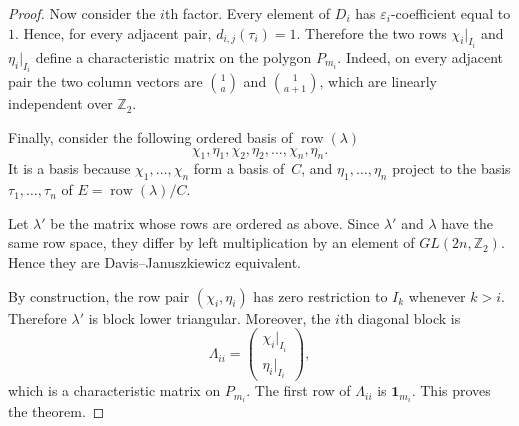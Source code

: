 \documentclass[10pt,a4paper]{amsart}
\newcommand{\Z}{\mathbb Z}
\newcommand{\one}{\mathbf 1}
\DeclareMathOperator{\row}{row}
\begin{document}
\begin{proof}
    Now consider the $i$th factor.
    Every element of $D_i$ has $\varepsilon_i$-coefficient equal to $1$.
    Hence, for every adjacent pair, $d_{i,j}(\tau_i)=1$.
    Therefore the two rows $\chi_i|_{I_i}$ and $\eta_i|_{I_i}$ define a characteristic matrix on the polygon $P_{m_i}$.
    Indeed, on every adjacent pair the two column vectors are $\binom{1}{a}$ and $\binom{1}{a+1}$, which are linearly independent over $\Z_2$.
        
    Finally, consider the following ordered basis of $\row(\lambda)$
    $$
            \chi_1,\eta_1,\chi_2,\eta_2,\ldots,\chi_n,\eta_n.
    $$
    It is a basis because $\chi_1,\ldots,\chi_n$ form a basis of~$C$, and $\eta_1,\ldots,\eta_n$ project to the basis $\tau_1,\ldots,\tau_n$ of $E=\row(\lambda)/C$.
        
    Let $\lambda'$ be the matrix whose rows are ordered as above.
    Since $\lambda'$ and $\lambda$ have the same row space, they differ by left multiplication by an element of $GL(2n,\Z_2)$.
    Hence they are Davis--Januszkiewicz equivalent.
        
    By construction, the row pair $(\chi_i,\eta_i)$ has zero restriction to $I_k$ whenever $k>i$.
    Therefore $\lambda'$ is block lower triangular.
    Moreover, the $i$th diagonal block is
    $$
        \Lambda_{ii}
        =
        \begin{pmatrix}
        \chi_i|_{I_i}\\
        \eta_i|_{I_i}
        \end{pmatrix},
    $$
    which is a characteristic matrix on $P_{m_i}$.
    The first row of $\Lambda_{ii}$ is $\one_{m_i}$.
    This proves the theorem.
\end{proof}
\end{document}
